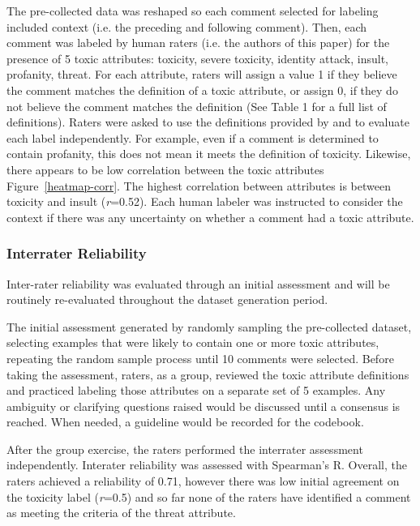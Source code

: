 \documentclass[11pt]{article}
\begin{document}
The pre-collected data was reshaped so each comment selected for labeling included context (i.e. the preceding and following comment). Then, each comment was labeled by human raters (i.e. the authors of this paper) for the presence of 5 toxic attributes: toxicity, severe toxicity, identity attack, insult, profanity, threat. For each attribute, raters will assign a value 1 if they believe the comment matches the definition of a toxic attribute, or assign 0, if they do not believe the comment matches the definition (See Table 1 for a full list of definitions). Raters were asked to use the definitions provided by \citet{Perspective2022} and to evaluate each label independently. For example, even if a comment is determined to contain profanity, this does not mean it meets the definition of toxicity. Likewise, there appears to be low correlation between the toxic attributes Figure~\ref{heatmap-corr}. The highest correlation between attributes is between toxicity and insult (\emph{r}=0.52). Each human labeler was instructed to consider the context if there was any uncertainty on whether a comment had a toxic attribute.

\subsubsection{Interrater Reliability}
Inter-rater reliability was evaluated through an initial assessment and will be routinely re-evaluated throughout the dataset generation period. 

The initial assessment generated by randomly sampling the pre-collected dataset, selecting examples that were likely to contain one or more toxic attributes, repeating the random sample process until 10 comments were selected. Before taking the assessment, raters, as a group, reviewed the toxic attribute definitions and practiced labeling those attributes on a separate set of 5 examples. Any ambiguity or clarifying questions raised would be discussed until a consensus is reached. When needed, a guideline would be recorded for the codebook.

After the group exercise, the raters performed the interrater assessment independently. Interater reliability was assessed with Spearman's R. Overall, the raters achieved a reliability of 0.71, however there was low initial agreement on the toxicity label (\emph{r}=0.5) and so far none of the raters have identified a comment as meeting the criteria of the threat attribute.
\end{document}
